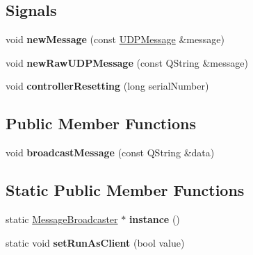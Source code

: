\subsection*{Signals}
\begin{DoxyCompactItemize}
\item 
\mbox{\label{class_message_broadcaster_a5fd9f33c5596dd29a34a280c828d5d69}} 
void {\bfseries new\+Message} (const \hyperlink{class_u_d_p_message}{U\+D\+P\+Message} \&message)
\item 
\mbox{\label{class_message_broadcaster_a7beb9f1957e0616a367a63af4515200b}} 
void {\bfseries new\+Raw\+U\+D\+P\+Message} (const Q\+String \&message)
\item 
\mbox{\label{class_message_broadcaster_a7c20965394c805fbf3b4e9bcd26ea562}} 
void {\bfseries controller\+Resetting} (long serial\+Number)
\end{DoxyCompactItemize}
\subsection*{Public Member Functions}
\begin{DoxyCompactItemize}
\item 
\mbox{\label{class_message_broadcaster_aad0a58bca9ec48cb0b0b0bf4c724e7f8}} 
void {\bfseries broadcast\+Message} (const Q\+String \&data)
\end{DoxyCompactItemize}
\subsection*{Static Public Member Functions}
\begin{DoxyCompactItemize}
\item 
\mbox{\label{class_message_broadcaster_aff3184a82432cde75fcaa24b76c89904}} 
static \hyperlink{class_message_broadcaster}{Message\+Broadcaster} $\ast$ {\bfseries instance} ()
\item 
\mbox{\label{class_message_broadcaster_a5a0a4b1fb88a50dfeacb5a2e46c1013b}} 
static void {\bfseries set\+Run\+As\+Client} (bool value)
\end{DoxyCompactItemize}
